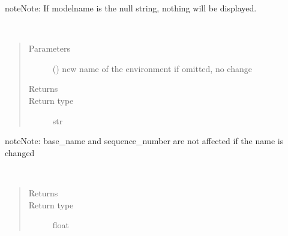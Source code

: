 \documentclass[letterpaper,10pt,english]{sphinxmanual}
\begin{document}
\begin{fulllineitems}
\begin{fulllineitems}
\begin{sphinxadmonition}{note}{Note:}
If modelname is the null string, nothing will be displayed.
\end{sphinxadmonition}

\end{fulllineitems}


\begin{fulllineitems}
\label{\detokenize{Reference:salabim.Environment.name}}~\begin{quote}\begin{description}
\item[{Parameters}] \leavevmode
{} () \textendash{} new name of the environment
if omitted, no change

\item[{Returns}] \leavevmode
{}

\item[{Return type}] \leavevmode
str

\end{description}\end{quote}

\begin{sphinxadmonition}{note}{Note:}
base\_name and sequence\_number are not affected if the name is changed
\end{sphinxadmonition}

\end{fulllineitems}


\begin{fulllineitems}
\label{\detokenize{Reference:salabim.Environment.now}}~\begin{quote}\begin{description}
\item[{Returns}] \leavevmode
{}

\item[{Return type}] \leavevmode
float

\end{description}\end{quote}

\end{fulllineitems}


\end{fulllineitems}
\end{document}
